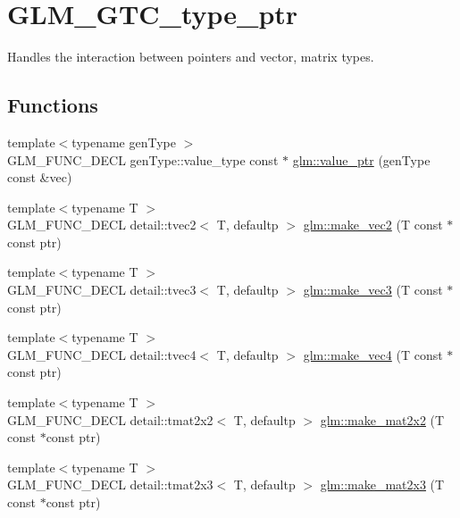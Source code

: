 \hypertarget{group__gtc__type__ptr}{}\section{G\+L\+M\+\_\+\+G\+T\+C\+\_\+type\+\_\+ptr}
\label{group__gtc__type__ptr}


Handles the interaction between pointers and vector, matrix types.  


\subsection*{Functions}
\begin{DoxyCompactItemize}
\item 
{\footnotesize template$<$typename gen\+Type $>$ }\\G\+L\+M\+\_\+\+F\+U\+N\+C\+\_\+\+D\+E\+CL gen\+Type\+::value\+\_\+type const $\ast$ \hyperlink{group__gtc__type__ptr_gaf019636bb8bd7c9efb7c7ce3bb23bcfc}{glm\+::value\+\_\+ptr} (gen\+Type const \&vec)
\item 
{\footnotesize template$<$typename T $>$ }\\G\+L\+M\+\_\+\+F\+U\+N\+C\+\_\+\+D\+E\+CL detail\+::tvec2$<$ T, defaultp $>$ \hyperlink{group__gtc__type__ptr_ga70f570befb4773ba3a658b76f9fdd6ab}{glm\+::make\+\_\+vec2} (T const $\ast$const ptr)
\item 
{\footnotesize template$<$typename T $>$ }\\G\+L\+M\+\_\+\+F\+U\+N\+C\+\_\+\+D\+E\+CL detail\+::tvec3$<$ T, defaultp $>$ \hyperlink{group__gtc__type__ptr_gad91a6a0fe324630b151208703a1591ed}{glm\+::make\+\_\+vec3} (T const $\ast$const ptr)
\item 
{\footnotesize template$<$typename T $>$ }\\G\+L\+M\+\_\+\+F\+U\+N\+C\+\_\+\+D\+E\+CL detail\+::tvec4$<$ T, defaultp $>$ \hyperlink{group__gtc__type__ptr_ga1b9e0d9ca48d79ba87edc121c1872c44}{glm\+::make\+\_\+vec4} (T const $\ast$const ptr)
\item 
{\footnotesize template$<$typename T $>$ }\\G\+L\+M\+\_\+\+F\+U\+N\+C\+\_\+\+D\+E\+CL detail\+::tmat2x2$<$ T, defaultp $>$ \hyperlink{group__gtc__type__ptr_ga860d529f631ea6f9a0e510491d29a8ac}{glm\+::make\+\_\+mat2x2} (T const $\ast$const ptr)
\item 
{\footnotesize template$<$typename T $>$ }\\G\+L\+M\+\_\+\+F\+U\+N\+C\+\_\+\+D\+E\+CL detail\+::tmat2x3$<$ T, defaultp $>$ \hyperlink{group__gtc__type__ptr_gadef48cd950566f23a4b1e47127ee478c}{glm\+::make\+\_\+mat2x3} (T const $\ast$const ptr)

\end{DoxyCompactItemize}
